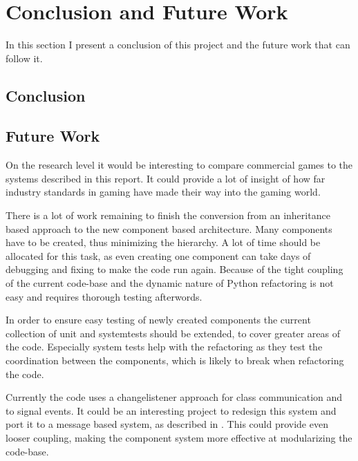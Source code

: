 \section{Conclusion and Future Work}
In this section I present a conclusion of this project and the future work that can follow it.

\subsection{Conclusion}



\subsection{Future Work}
On the research level it would be interesting to compare commercial games to the \OS{} systems described in this
report. It could provide a lot of insight of how far industry standards in gaming have made their way into the \OS{}
gaming world.

There is a lot of work remaining to finish the conversion from an inheritance based approach to the new component based
architecture. Many components have to be created, thus minimizing the hierarchy. A lot of time should be allocated for
this task, as even creating one component can take days of debugging and fixing to make the code run again. Because of
the tight coupling of the current code-base and the dynamic nature of Python refactoring is not easy and requires
thorough testing afterwords.

In order to ensure easy testing of newly created components the current collection of unit and systemtests should be
extended, to cover greater areas of the code. Especially system tests help with the refactoring as they test the
coordination between the components, which is likely to break when refactoring the code.

Currently the code uses a changelistener approach for class communication and to signal events. It could be an
interesting project to redesign this system and port it to a message based system, as described in \cite{Fh02ageneric}.
This could provide even looser coupling, making the component system more effective at modularizing the code-base.

